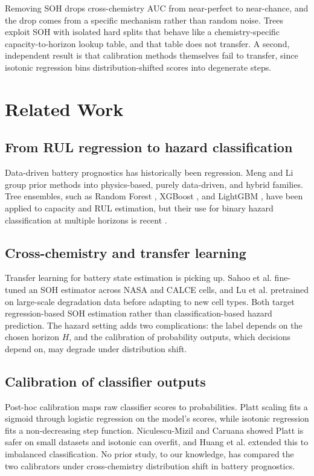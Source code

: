 \documentclass[journal]{IEEEtran}
\begin{document}
Removing SOH drops cross-chemistry AUC from near-perfect to near-chance, and the drop comes from a specific mechanism rather than random noise. Trees exploit SOH with isolated hard splits that behave like a chemistry-specific capacity-to-horizon lookup table, and that table does not transfer. A second, independent result is that calibration methods themselves fail to transfer, since isotonic regression bins distribution-shifted scores into degenerate steps.

\section{Related Work}

\subsection{From RUL regression to hazard classification}
Data-driven battery prognostics has historically been regression. Meng and Li \cite{meng2019review} group prior methods into physics-based, purely data-driven, and hybrid families. Tree ensembles, such as Random Forest \cite{breiman2001random}, XGBoost \cite{chen2016xgboost}, and LightGBM \cite{ke2017lightgbm}, have been applied to capacity and RUL estimation, but their use for binary hazard classification at multiple horizons is recent \cite{shikdar2026learning}.

\subsection{Cross-chemistry and transfer learning}
Transfer learning for battery state estimation is picking up. Sahoo et al. \cite{sahoo2022transfer} fine-tuned an SOH estimator across NASA and CALCE cells, and Lu et al. \cite{lu2023deep} pretrained on large-scale degradation data before adapting to new cell types. Both target regression-based SOH estimation rather than classification-based hazard prediction. The hazard setting adds two complications: the label depends on the chosen horizon $H$, and the calibration of probability outputs, which decisions depend on, may degrade under distribution shift.

\subsection{Calibration of classifier outputs}
Post-hoc calibration maps raw classifier scores to probabilities. Platt scaling \cite{platt1999probabilistic} fits a sigmoid through logistic regression on the model's scores, while isotonic regression \cite{zadrozny2002transforming} fits a non-decreasing step function. Niculescu-Mizil and Caruana \cite{niculescu2005predicting} showed Platt is safer on small datasets and isotonic can overfit, and Huang et al. \cite{huang2020experimental} extended this to imbalanced classification. No prior study, to our knowledge, has compared the two calibrators under cross-chemistry distribution shift in battery prognostics.
\end{document}
